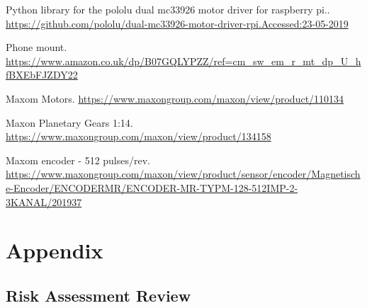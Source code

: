 \documentclass[twoside,twocolumn,12pt]{article}
\begin{document}
\begin{thebibliography}{9}
Python library for the pololu dual mc33926 motor driver for raspberry pi.. \url{https://github.com/pololu/dual-mc33926-motor-driver-rpi.Accessed:23-05-2019}

Phone mount. \url{https://www.amazon.co.uk/dp/B07GQLYPZZ/ref=cm_sw_em_r_mt_dp_U_hfBXEbFJZDY22}

Maxom Motors. \url{https://www.maxongroup.com/maxon/view/product/110134}


Maxon Planetary Gears 1:14. \url{https://www.maxongroup.com/maxon/view/product/134158}

Maxom encoder - 512 pulses/rev. \url{https://www.maxongroup.com/maxon/view/product/sensor/encoder/Magnetische-Encoder/ENCODERMR/ENCODER-MR-TYPM-128-512IMP-2-3KANAL/201937}

\end{thebibliography}



\clearpage
\section{Appendix}
\subsection{Risk Assessment Review}





\end{document}
